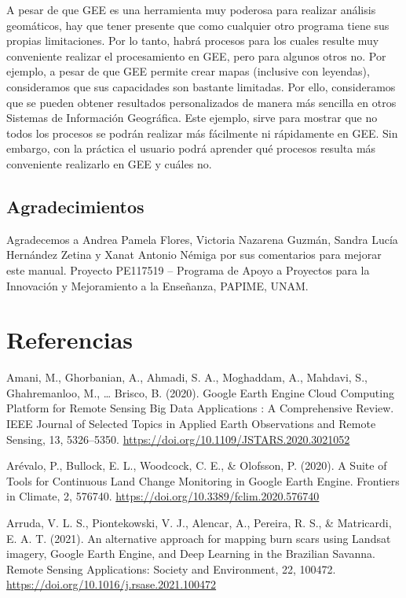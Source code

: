 \documentclass[
  12pt,
  letterpaper,
  twoside]{book}
\begin{document}
A pesar de que GEE es una herramienta muy poderosa para realizar análisis geomáticos, hay que tener presente que como cualquier otro programa tiene sus propias limitaciones. Por lo tanto, habrá procesos para los cuales resulte muy conveniente realizar el procesamiento en GEE, pero para algunos otros no. Por ejemplo, a pesar de que GEE permite crear mapas (inclusive con leyendas), consideramos que sus capacidades son bastante limitadas. Por ello, consideramos que se pueden obtener resultados personalizados de manera más sencilla en otros Sistemas de Información Geográfica. Este ejemplo, sirve para mostrar que no todos los procesos se podrán realizar más fácilmente ni rápidamente en GEE. Sin embargo, con la práctica el usuario podrá aprender qué procesos resulta más conveniente realizarlo en GEE y cuáles no.

\hypertarget{agradecimientos}{%
\section{Agradecimientos}\label{agradecimientos}}

Agradecemos a Andrea Pamela Flores, Victoria Nazarena Guzmán, Sandra Lucía Hernández Zetina y Xanat Antonio Némiga por sus comentarios para mejorar este manual.
Proyecto PE117519 -- Programa de Apoyo a Proyectos para la Innovación y Mejoramiento a la Enseñanza, PAPIME, UNAM.

\newpage
\backmatter

\hypertarget{referencias}{%
\chapter{Referencias}\label{referencias}}

Amani, M., Ghorbanian, A., Ahmadi, S. A., Moghaddam, A., Mahdavi, S., Ghahremanloo, M., \ldots{} Brisco, B. (2020). Google Earth Engine Cloud Computing Platform for Remote Sensing Big Data Applications : A Comprehensive Review. IEEE Journal of Selected Topics in Applied Earth Observations and Remote Sensing, 13, 5326--5350. \url{https://doi.org/10.1109/JSTARS.2020.3021052}

Arévalo, P., Bullock, E. L., Woodcock, C. E., \& Olofsson, P. (2020). A Suite of Tools for Continuous Land Change Monitoring in Google Earth Engine. Frontiers in Climate, 2, 576740. \url{https://doi.org/10.3389/fclim.2020.576740}

Arruda, V. L. S., Piontekowski, V. J., Alencar, A., Pereira, R. S., \& Matricardi, E. A. T. (2021). An alternative approach for mapping burn scars using Landsat imagery, Google Earth Engine, and Deep Learning in the Brazilian Savanna. Remote Sensing Applications: Society and Environment, 22, 100472. \url{https://doi.org/10.1016/j.rsase.2021.100472}
\end{document}
